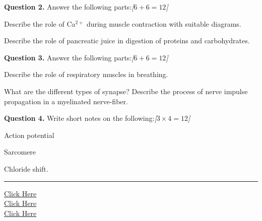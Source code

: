 \documentclass[11pt,a4paper]{article}
\newcommand{\pts}[1]{\hfill   \textit{[#1]}}
\begin{document}
\medskip


\noindent   \textbf{Question 2.} Answer the following parts:\pts{$6 + 6 = 12$}

\begin{parts}
  \item Describe the role of Ca$^{2+}$ during muscle contraction with suitable diagrams.
  \item Describe the role of pancreatic juice in digestion of proteins and carbohydrates.
\end{parts}

\medskip


\noindent   \textbf{Question 3.} Answer the following parts:\pts{$6 + 6 = 12$}

\begin{parts}
  \item Describe the role of respiratory muscles in breathing.
  \item What are the different types of synapse? Describe the process of nerve impulse propagation in a myelinated nerve-fiber.
\end{parts}

\medskip


\noindent   \textbf{Question 4.} Write short notes on the following:\pts{$3  \times 4 = 12$}

\begin{parts}
  \item Action potential
  \item Sarcomere
  \item Chloride shift.
\end{parts}

\vfill
\rule{\linewidth}{0.4pt}

\begin{center}\small
\href{https://bhu-exam.vercel.app/}{Click Here}\\[4pt]\href{https://me-aryan.vercel.app/}{Click Here}\\[4pt]\href{https://quashan-me.vercel.app/}{Click Here}
\end{center}
\end{document}
